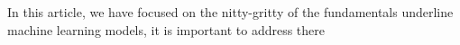In this article, we have focused on the nitty-gritty of the fundamentals underline machine learning models, it is important to address there 